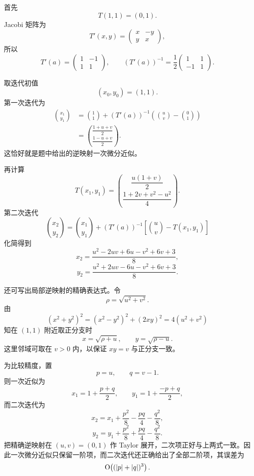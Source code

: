\begin{xsolution}
首先
\[
  T(1,1)=(0,1).
\]
Jacobi 矩阵为
\[
  T'(x,y)=
  \begin{pmatrix}
    x&-y\\y&x
  \end{pmatrix},
\]
所以
\[
  \boxed{\displaystyle
  T'(a)=\begin{pmatrix}1&-1\\1&1\end{pmatrix}},
  \qquad
  \boxed{\displaystyle
  (T'(a))^{-1}=\frac12
  \begin{pmatrix}1&1\\-1&1\end{pmatrix}}.
\]

取迭代初值
\[
  (x_0,y_0)=(1,1).
\]
第一次迭代为
\begin{align*}
  \binom{x_1}{y_1}
  &=\binom11+(T'(a))^{-1}
    \left(\binom uv-\binom01\right)\\
  &=\binom{\dfrac{1+u+v}{2}}
           {\dfrac{1-u+v}{2}}.
\end{align*}
这恰好就是题中给出的逆映射一次微分近似。

再计算
\[
  T(x_1,y_1)
  =\binom{\dfrac{u(1+v)}2}
          {\dfrac{1+2v+v^2-u^2}{4}}.
\]
第二次迭代
\[
  \binom{x_2}{y_2}
  =\binom{x_1}{y_1}
   +(T'(a))^{-1}
    \left[\binom uv-T(x_1,y_1)\right]
\]
化简得到
\[
  \boxed{\displaystyle
  x_2=\frac{u^2-2uv+6u-v^2+6v+3}{8}},
\]
\[
  \boxed{\displaystyle
  y_2=\frac{u^2+2uv-6u-v^2+6v+3}{8}}.
\]

还可写出局部逆映射的精确表达式。令
\[
  \rho=\sqrt{u^2+v^2}.
\]
由
\[
  (x^2+y^2)^2=(x^2-y^2)^2+(2xy)^2=4(u^2+v^2)
\]
知在 $(1,1)$ 附近取正分支时
\[
  \boxed{\displaystyle
    x=\sqrt{\rho+u},\qquad
    y=\sqrt{\rho-u}}.
\]
这里邻域可取在 $v>0$ 内，以保证 $xy=v$ 与正分支一致。

为比较精度，置
\[
  p=u,\qquad q=v-1.
\]
则一次近似为
\[
  x_1=1+\frac{p+q}{2},
  \qquad
  y_1=1+\frac{-p+q}{2},
\]
而二次迭代为
\[
  x_2=x_1+\frac{p^2}{8}-\frac{pq}{4}-\frac{q^2}{8},
\]
\[
  y_2=y_1+\frac{p^2}{8}+\frac{pq}{4}-\frac{q^2}{8}.
\]
把精确逆映射在 $(u,v)=(0,1)$ 作 Taylor 展开，二次项正好与上两式一致。因此一次微分近似只保留一阶项，而二次迭代还正确给出了全部二阶项，其误差为
\[
  \mathrm{O}\!\left((\lvert p\rvert+\lvert q\rvert)^3\right).
\]
\end{xsolution}


